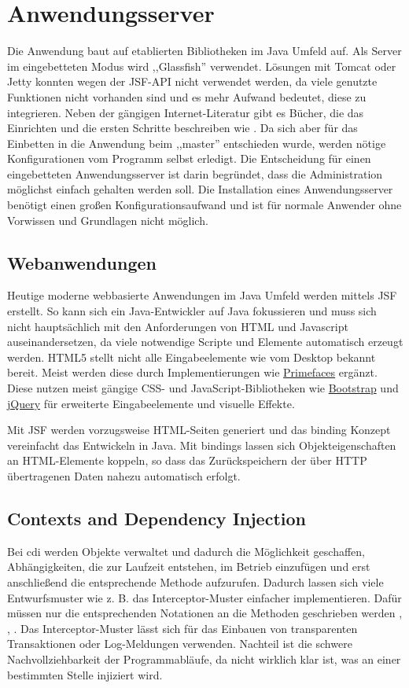 \documentclass[oneside, ngerman, toc=bibliography,bibliography=totoc,listof=entryprefix, open=right,numbers=noenddot,fontsize=12pt]{scrbook}
\begin{document}
\section{Anwendungsserver}
\label{chap:appserv}
Die Anwendung baut auf etablierten Bibliotheken im Java Umfeld auf. Als Server im eingebetteten Modus wird ,,Glassfish'' verwendet.
Lösungen mit Tomcat oder Jetty konnten wegen der JSF-API nicht verwendet werden, da viele genutzte Funktionen nicht vorhanden sind und es mehr Aufwand bedeutet, diese zu integrieren. Neben der gängigen Internet-Literatur gibt es Bücher, die das Einrichten und die ersten Schritte beschreiben wie \cite{glassfishee7}. Da sich aber für das Einbetten in die Anwendung beim ,,master'' entschieden wurde, werden nötige Konfigurationen vom Programm selbst erledigt.
Die Entscheidung für einen eingebetteten Anwendungsserver ist darin begründet, dass die Administration möglichst einfach gehalten werden soll.
Die Installation eines Anwendungsserver benötigt einen großen Konfigurationsaufwand und ist für normale Anwender ohne Vorwissen und Grundlagen nicht möglich.


\subsection{Webanwendungen}
Heutige moderne webbasierte Anwendungen im Java Umfeld werden mittels {JSF} erstellt. So kann sich ein Java-Entwickler auf Java fokussieren und muss sich nicht hauptsächlich mit den Anforderungen von HTML und Javascript auseinandersetzen, da viele notwendige Scripte und Elemente automatisch erzeugt werden. HTML5 stellt nicht alle Eingabeelemente wie vom Desktop bekannt bereit. Meist werden diese durch Implementierungen wie \href{http://primefaces.org/}{{Primefaces}} ergänzt. Diese nutzen meist gängige CSS- und JavaScript-Bibliotheken wie \href{http://getbootstrap.com/}{Bootstrap} und \href{https://jquery.com/}{jQuery} für erweiterte Eingabeelemente und visuelle Effekte.

Mit JSF  werden vorzugsweise HTML-Seiten generiert und das binding Konzept vereinfacht das Entwickeln in Java.
Mit bindings lassen sich Objekteigenschaften an HTML-Elemente koppeln, so dass das Zurückspeichern der über HTTP übertragenen Daten nahezu automatisch erfolgt.

\subsection{Contexts and Dependency Injection}
Bei \acrfull{cdi} werden Objekte verwaltet und dadurch die Möglichkeit geschaffen, Abhängigkeiten, die zur Laufzeit entstehen, im Betrieb einzufügen und erst anschließend die entsprechende Methode aufzurufen. Dadurch lassen sich viele Entwurfsmuster wie z. B. das Interceptor-Muster einfacher implementieren. Dafür müssen nur die entsprechenden Notationen an die Methoden geschrieben werden \cite{schmidt2002pattern}, \cite{gamma2011entwurfsmuster}, \cite{bien2003j2ee}. Das Interceptor-Muster lässt sich für das Einbauen von transparenten Transaktionen oder Log-Meldungen verwenden. Nachteil ist die schwere Nachvollziehbarkeit der Programmabläufe, da nicht wirklich klar ist, was an einer bestimmten Stelle injiziert wird.
\end{document}
